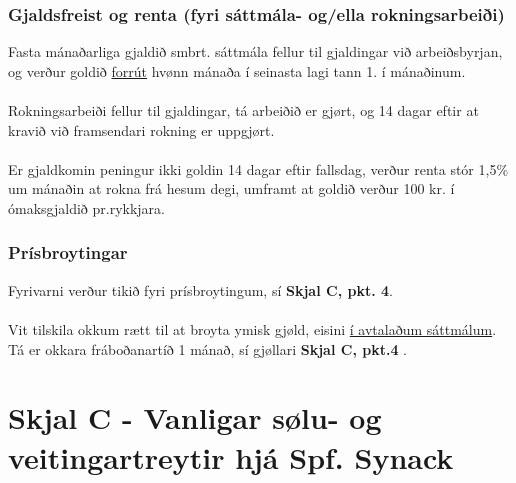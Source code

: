\subsubsection*{Gjaldsfreist og renta (fyri sáttmála- og/ella rokningsarbeiði)}
Fasta mánaðarliga gjaldið smbrt. sáttmála fellur til gjaldingar við arbeiðsbyrjan, og verður goldið \underline{forrút} hvønn mánaða í seinasta lagi tann 1. í mánaðinum. \\ \\
Rokningsarbeiði fellur til gjaldingar, tá arbeiðið er gjørt, og 14 dagar eftir at kravið við framsendari rokning er uppgjørt. \\ \\
Er gjaldkomin peningur ikki goldin 14 dagar eftir fallsdag, verður renta stór 1,5\% um mánaðin at rokna frá hesum degi, umframt at goldið verður 100 kr. í ómaksgjaldið pr.rykkjara. \\

\subsubsection*{Prísbroytingar}
Fyrivarni verður tikið fyri prísbroytingum, sí \textbf{Skjal C, pkt. 4}. \\ \\
Vit tilskila okkum rætt til at broyta ymisk gjøld, eisini \underline{í avtalaðum sáttmálum}. Tá er okkara fráboðanartíð 1 mánað, sí gjøllari \textbf{Skjal C, pkt.4} . \\
\newpage


\section{Skjal C - Vanligar sølu- og veitingartreytir hjá Spf. Synack}
